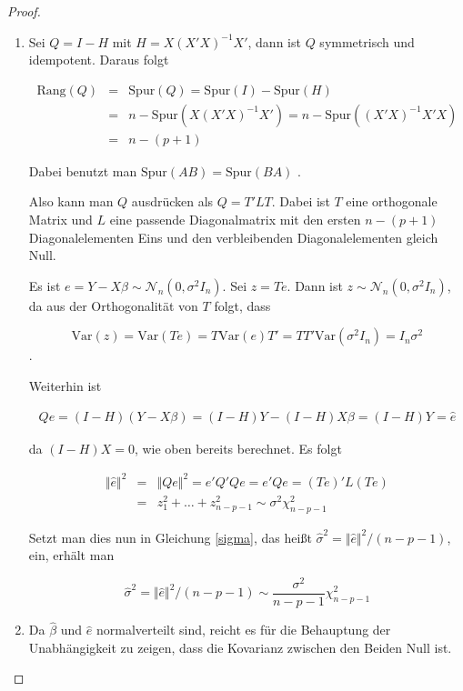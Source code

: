 \documentclass[12pt,a4paper]{article}
\theoremstyle{definition}
\theoremstyle{definition}
\theoremstyle{definition}
\theoremstyle{definition}
\begin{document}
\begin{proof}
\begin{enumerate}
\item Sei $Q=I-H$ mit $H = X (X'X)^{-1} X'$, dann ist $Q$ symmetrisch und idempotent. Daraus folgt

\begin{eqnarray*}
\text{Rang}(Q) &=& \text{Spur}(Q) = \text{Spur}(I) - \text{Spur}(H) \\
		&=& n - \text{Spur}(X(X'X)^{-1}X') = n - \text{Spur}((X'X)^{-1}X'X) \\
		&=& n - (p+1)
\end{eqnarray*}

Dabei benutzt man $\text{Spur}(AB) = \text{Spur}(BA)$ . 

Also kann man $Q$ ausdrücken als $ Q = T' L T$. Dabei ist $T$ eine orthogonale Matrix und $L$ eine passende Diagonalmatrix mit den ersten $n-(p+1)$ Diagonalelementen Eins und den verbleibenden Diagonalelementen gleich Null.

Es ist $e=Y-X\beta \sim \mathscr{N}_{n}(0,\sigma^2 I_n)$. Sei $z=Te$. Dann ist $z\sim \mathscr{N}_{n}(0,\sigma^2 I_n)$, da aus der Orthogonalität von $T$ folgt, dass 

\begin{equation*}
\text{Var}(z) = \text{Var}(Te) = T \text{Var}(e) T' = T T' \text{Var}(\sigma^2 I_n) = I_n \sigma^2
\end{equation*}
. 

Weiterhin ist 

\begin{eqnarray*}
Qe = (I-H) (Y-X\beta) = (I-H)Y - (I-H)X \beta = (I-H)Y = \hat{e}
\end{eqnarray*}

da $(I-H)X=0$, wie oben bereits berechnet. Es folgt

\begin{eqnarray*}
\Vert \hat{e} \Vert^2 &=& \Vert Qe \Vert^2 = e'Q'Qe = e'Qe = (Te)' L (Te) \\
&=& z_1^2 + \ldots + z_{n-p-1}^2 \sim \sigma^2 \chi_{n-p-1}^2
\end{eqnarray*}

Setzt man dies nun in Gleichung \eqref{sigma}, das heißt $ \hat{\sigma}^2 = \Vert \hat{e} \Vert^{2} / (n-p-1) $, ein, erhält man 

\begin{equation*}
\hat{\sigma}^2 = \Vert \hat{e} \Vert^{2} / (n-p-1) \sim \frac{\sigma^2}{n-p-1} \chi_{n-p-1}^2
\end{equation*}


\item Da $\hat{\beta}$ und $\hat{e}$ normalverteilt sind, reicht es für die Behauptung der Unabhängigkeit zu zeigen, dass die Kovarianz zwischen den Beiden Null ist.


\end{enumerate}
\end{proof}
\end{document}
